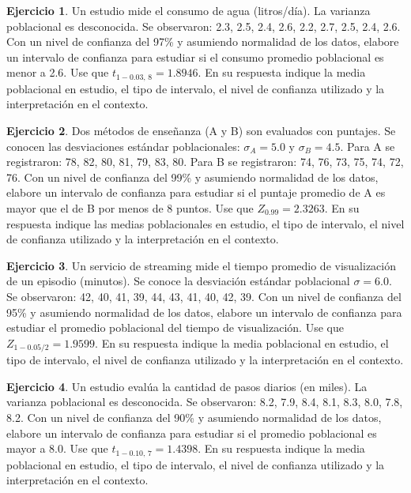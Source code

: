 \documentclass[
  11pt,
]{book}
\theoremstyle{definition}
\theoremstyle{definition}
\theoremstyle{definition}
\newtheorem{exercise}{Ejercicio}[chapter]
\theoremstyle{definition}
\theoremstyle{remark}
\begin{document}
\begin{exercise}
Un estudio mide el consumo de agua (litros/día). La varianza poblacional es desconocida. Se observaron: 2.3, 2.5, 2.4, 2.6, 2.2, 2.7, 2.5, 2.4, 2.6. Con un nivel de confianza del 97\% y asumiendo normalidad de los datos, elabore un intervalo de confianza para estudiar si el consumo promedio poblacional es menor a 2.6. Use que \(t_{1-0.03,\,8} = 1.8946\). En su respuesta indique la media poblacional en estudio, el tipo de intervalo, el nivel de confianza utilizado y la interpretación en el contexto.
\end{exercise}

\begin{exercise}
Dos métodos de enseñanza (A y B) son evaluados con puntajes. Se conocen las desviaciones estándar poblacionales: \(\sigma_A = 5.0\) y \(\sigma_B = 4.5\). Para A se registraron: 78, 82, 80, 81, 79, 83, 80. Para B se registraron: 74, 76, 73, 75, 74, 72, 76. Con un nivel de confianza del 99\% y asumiendo normalidad de los datos, elabore un intervalo de confianza para estudiar si el puntaje promedio de A es mayor que el de B por menos de 8 puntos. Use que \(Z_{0.99} = 2.3263\). En su respuesta indique las medias poblacionales en estudio, el tipo de intervalo, el nivel de confianza utilizado y la interpretación en el contexto.
\end{exercise}

\begin{exercise}
Un servicio de streaming mide el tiempo promedio de visualización de un episodio (minutos). Se conoce la desviación estándar poblacional \(\sigma = 6.0\). Se observaron: 42, 40, 41, 39, 44, 43, 41, 40, 42, 39. Con un nivel de confianza del 95\% y asumiendo normalidad de los datos, elabore un intervalo de confianza para estudiar el promedio poblacional del tiempo de visualización. Use que \(Z_{1-0.05/2} = 1.9599\). En su respuesta indique la media poblacional en estudio, el tipo de intervalo, el nivel de confianza utilizado y la interpretación en el contexto.
\end{exercise}

\begin{exercise}
Un estudio evalúa la cantidad de pasos diarios (en miles). La varianza poblacional es desconocida. Se observaron: 8.2, 7.9, 8.4, 8.1, 8.3, 8.0, 7.8, 8.2. Con un nivel de confianza del 90\% y asumiendo normalidad de los datos, elabore un intervalo de confianza para estudiar si el promedio poblacional es mayor a 8.0. Use que \(t_{1-0.10,\,7} = 1.4398\). En su respuesta indique la media poblacional en estudio, el tipo de intervalo, el nivel de confianza utilizado y la interpretación en el contexto.
\end{exercise}
\end{document}
